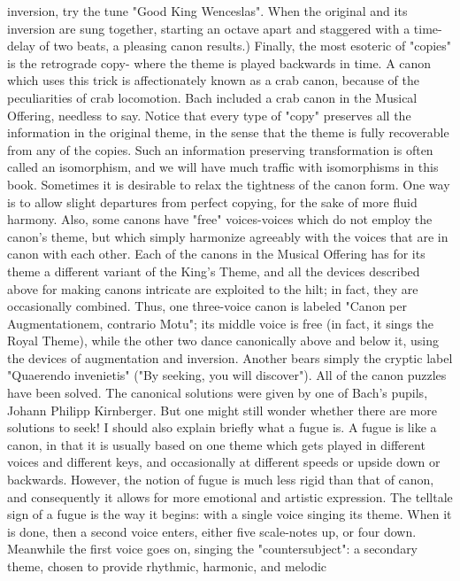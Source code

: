 inversion, try the tune "Good King Wenceslas". When the original and its inversion are
sung together, starting an octave apart and staggered with a time-delay of two beats, a
pleasing canon results.) Finally, the most esoteric of "copies" is the retrograde copy-
where the theme is played backwards in time. A canon which uses this trick is
affectionately known as a crab canon, because of the peculiarities of crab locomotion.
Bach included a crab canon in the Musical Offering, needless to say. Notice that every
type of "copy" preserves all the information in the original theme, in the sense that the
theme is fully recoverable from any of the copies. Such an information preserving
transformation is often called an isomorphism, and we will have much traffic with
isomorphisms in this book.
   Sometimes it is desirable to relax the tightness of the canon form. One way is to allow
slight departures from perfect copying, for the sake of more fluid harmony. Also, some
canons have "free" voices-voices which do not employ the canon's theme, but which
simply harmonize agreeably with the voices that are in canon with each other.
   Each of the canons in the Musical Offering has for its theme a different variant of the
King's Theme, and all the devices described above for making canons intricate are
exploited to the hilt; in fact, they are occasionally combined. Thus, one three-voice canon
is labeled "Canon per Augmentationem, contrario Motu"; its middle voice is free (in fact,
it sings the Royal Theme), while the other two dance canonically above and below it,
using the devices of augmentation and inversion. Another bears simply the cryptic label
"Quaerendo invenietis" ("By seeking, you will discover"). All of the canon puzzles have
been solved. The canonical solutions were given by one of Bach's pupils, Johann Philipp
Kirnberger. But one might still wonder whether there are more solutions to seek!
   I should also explain briefly what a fugue is. A fugue is like a canon, in that it is
usually based on one theme which gets played in different voices and different keys, and
occasionally at different speeds or upside down or backwards. However, the notion of
fugue is much less rigid than that of canon, and consequently it allows for more
emotional and artistic expression. The telltale sign of a fugue is the way it begins: with a
single voice singing its theme. When it is done, then a second voice enters, either five
scale-notes up, or four down. Meanwhile the first voice goes on, singing the
"countersubject": a secondary theme, chosen to provide rhythmic, harmonic, and melodic
